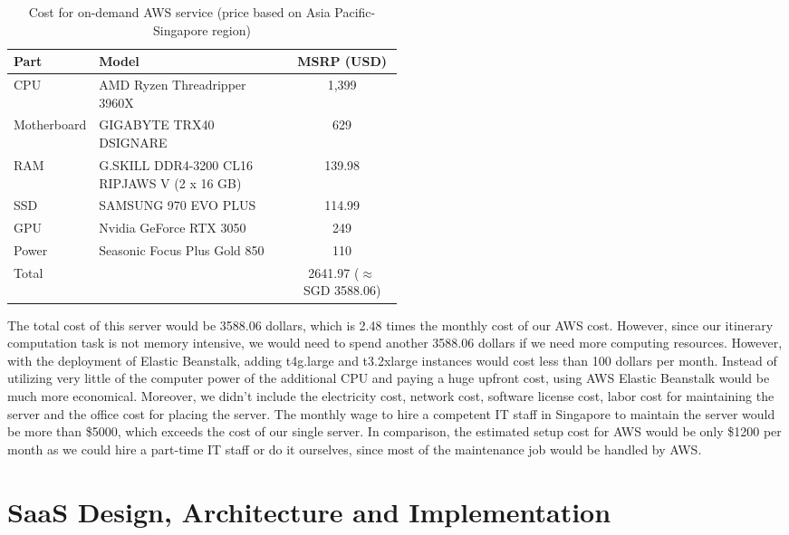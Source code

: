 \documentclass[12pt,a4paper]{article}
\begin{document}
\begin{table}[H]
	\centering
	\begin{tabular}{l|p{0.5\linewidth}|c}	%
	\hline \hline
	Part
	    & Model
	    & MSRP (USD)\\
		\hline
	CPU
		& AMD Ryzen Threadripper 3960X
		& 1,399 \\
	Motherboard
		& GIGABYTE TRX40 DSIGNARE
		& 629 \\
	RAM
	    & G.SKILL DDR4-3200 CL16 RIPJAWS V (2 x 16 GB)
    	& 139.98 \\
    SSD
        & SAMSUNG 970 EVO PLUS
        & 114.99 \\
    GPU
        & Nvidia GeForce RTX 3050
        & 249 \\
    Power
        & Seasonic Focus Plus Gold 850
        & 110 \\
    \hline
    Total
        &
        & 2641.97 ($\approx$ SGD 3588.06)\\
	\hline \hline
	\end{tabular}
	\caption{Cost for on-demand AWS service (price based on Asia Pacific-Singapore region)}
	\label{table_onpremise_it_resources}
\end{table}

The total cost of this server would be 3588.06 dollars, which is 2.48 times the monthly cost of our AWS cost. However, since our itinerary computation task is not memory intensive, we would need to spend another 3588.06 dollars if we need more computing resources. However, with the deployment of Elastic Beanstalk, adding t4g.large and t3.2xlarge instances would cost less than 100 dollars per month. Instead of utilizing very little of the computer power of the additional CPU and paying a huge upfront cost, using AWS Elastic Beanstalk would be much more economical. Moreover, we didn’t include the electricity cost, network cost, software license cost, labor cost for maintaining the server and the office cost for placing the server. The monthly wage to hire a competent IT staff in Singapore to maintain the server would be more than \$5000, which exceeds the cost of our single server. In comparison, the estimated setup cost for AWS would be only \$1200 per month as we could hire a part-time IT staff or do it ourselves, since most of the maintenance job would be handled by AWS.

\section{SaaS Design, Architecture and Implementation}
\end{document}

